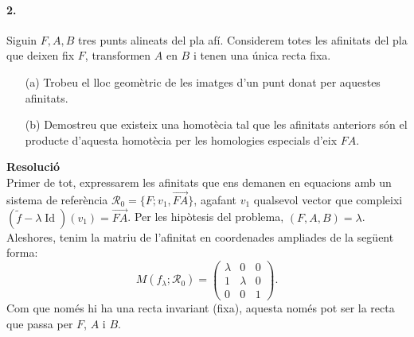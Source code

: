 \documentclass[11pt]{article}
\DeclareMathOperator{\idn}{Id}
\begin{document}
\paragraph{2.}	Siguin $F,A,B$ tres punts alineats del pla afí. Considerem totes les afinitats del pla que deixen fix $F$, transformen $A$ en $B$ i tenen una única recta fixa.
\begin{enumerate}
	\item[(a)] Trobeu el lloc geomètric de les imatges d'un punt donat per aquestes afinitats.
	\item[(b)] Demostreu que existeix una homotècia tal que les afinitats anteriors són el producte d'aquesta homotècia per les homologies especials d'eix $FA$.
\end{enumerate}
\textbf{Resolució}\\
Primer de tot, expressarem les afinitats que ens demanen en equacions amb un sistema de referència $\mathcal{R}_0=\{F;v_1,\vec{FA}\}$, agafant $v_1$ qualsevol vector que compleixi $(\tilde{f}-\lambda\idn)(v_1)=\vec{FA}$. Per les hipòtesis del problema, $(F,A,B)=\lambda$. Aleshores, tenim la matriu de l'afinitat en coordenades ampliades de la següent forma:
\[M(f_{\lambda};\mathcal{R}_0)=
\left(\begin{array}{cc|c}
\lambda & 0 & 0\\
1 & \lambda & 0\\
\hline
0 & 0 & 1
\end{array}\right).
\]
Com que només hi ha una recta invariant (fixa), aquesta només pot ser la recta que passa per $F$, $A$ i $B$.
\end{document}
